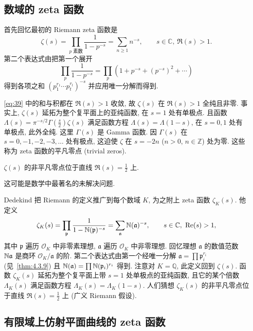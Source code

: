 \subsection*{数域的 zeta 函数}

首先回忆最初的 Riemann zeta 函数是
\begin{equation} \label{eq:39}
\zeta(s) = \prod_{p\text{ 素数}}\frac{1}{1-p^{-s}} = \sum_{n\ge 1}n^{-s}, \qquad s\in\mathbb{C}, \ \Re(s) > 1.
\tag{39}
\end{equation}
第二个表达式由把第一个展开 \[\prod_p\frac{1}{1-p^{-s}} = \prod_p(1 + p^{-s} + (p^{-s})^2 + \cdots)\] 得到各项之和 $(p_1^{r_1}\cdots p_t^{r_t})^{-s}$ 并应用唯一分解而得到.

\eqref{eq:39} 中的和与积都在 $\Re(s) > 1$ 收敛, 故 $\zeta(s)$ 在 $\Re(s) > 1$ 全纯且非零. 事实上, $\zeta(s)$ 延拓为整个复平面上的亚纯函数, 在 $s = 1$ 处有单极点. 且函数 $\Lambda(s) = \pi^{-s/2}\Gamma(\frac{s}{2})\zeta(s)$ 满足函数方程 $\Lambda(s) = \Lambda(1-s)$, 在 $s = 0, 1$ 处有单极点, 此外全纯. 这里 $\Gamma(s)$ 是 Gamma 函数. 因 $\Gamma(s)$ 在 $s = 0, -1, -2, -3, \dots$ 处有极点, 这迫使 $\zeta$ 在 $s = -2n$ ($n > 0$, $n\in\mathbb{Z}$) 处为零. 这些称为 zeta 函数的平凡零点 (trivial zeros).

\begin{conjecture}[Riemann 假设] \label{thm:4.9.6} 
$\zeta(s)$ 的非平凡零点位于直线 $\Re(s) = \frac{1}{2}$ 上.
\end{conjecture}

这可能是数学中最著名的未解决问题.

Dedekind 把 Riemann 的定义推广到每个数域 $K$, 为之附上 zeta 函数 $\zeta_K(s)$. 他定义
\[
\zeta_K(s) = \prod_{\mathfrak{p}}\frac{1}{1 - \Nm(\mathfrak{p})^{-s}} = \sum_{\mathfrak{a}}\Nm(\mathfrak{a})^{-s}, \qquad s\in\mathbb{C}, \ \Re(s) > 1,
\]
其中 $\mathfrak{p}$ 遍历 $\mathcal{O}_K$ 中非零素理想, $\mathfrak{a}$ 遍历 $\mathcal{O}_K$ 中非零理想. 回忆理想 $\mathfrak{a}$ 的数值范数 $\mathbb{N}\mathfrak{a}$ 是商环 $\mathcal{O}_K/\mathfrak{a}$ 的阶. 第二个表达式由第一个经唯一分解 $\mathfrak{a} = \prod\mathfrak{p}_i^{r_i}$ (见~\ref{thm:4.3.9}) 且 $\mathbb{N}(\mathfrak{a}) = \prod \mathbb{N}(\mathfrak{p}_i)^{r_i}$ 得到. 注意对 $K = \mathbb{Q}$, 此定义回到 $\zeta(s)$. 函数 $\zeta_K(s)$ 延拓为整个复平面上带 $s = 1$ 处单极点的亚纯函数, 且它的某个倍数 $\Lambda_K(s)$ 满足函数方程 $\Lambda_K(s) = \Lambda_K(1-s)$. 人们猜想 $\zeta_K(s)$ 的非平凡零点位于直线 $\Re(s) = \frac{1}{2}$ 上 (广义 Riemann 假设).

\subsection*{有限域上仿射平面曲线的 zeta 函数}

